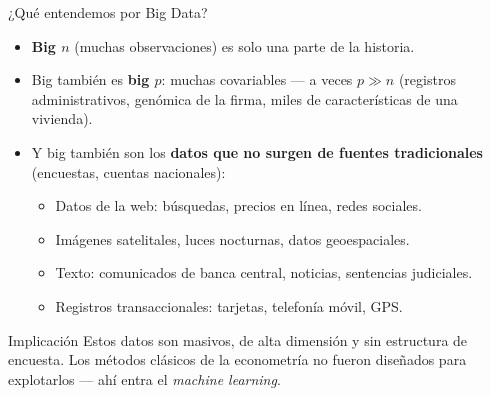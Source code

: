 \documentclass{beamer}
\newcommand{\1}{\mathbb{I}}
\begin{document}
\begin{frame}{¿Qué entendemos por Big Data?}
\small
\begin{itemize}\itemsep5pt
  \item \textbf{Big $n$} (muchas observaciones) es solo una parte de la historia. \pause
  \item Big también es \textbf{big $p$}: muchas covariables --- a veces $p \gg n$ (registros administrativos, genómica de la firma, miles de características de una vivienda). \pause
  \item Y big también son los \textbf{datos que no surgen de fuentes tradicionales} (encuestas, cuentas nacionales):
  \begin{itemize}\itemsep3pt
    \item Datos de la web: búsquedas, precios en línea, redes sociales.
    \item Imágenes satelitales, luces nocturnas, datos geoespaciales.
    \item Texto: comunicados de banca central, noticias, sentencias judiciales.
    \item Registros transaccionales: tarjetas, telefonía móvil, GPS.
  \end{itemize} \pause
\end{itemize}

\vspace{0.2cm}
\begin{block}{Implicación}
Estos datos son masivos, de alta dimensión y sin estructura de encuesta. Los métodos clásicos de la econometría no fueron diseñados para explotarlos --- ahí entra el \emph{machine learning}.
\end{block}
\end{frame}
\end{document}
